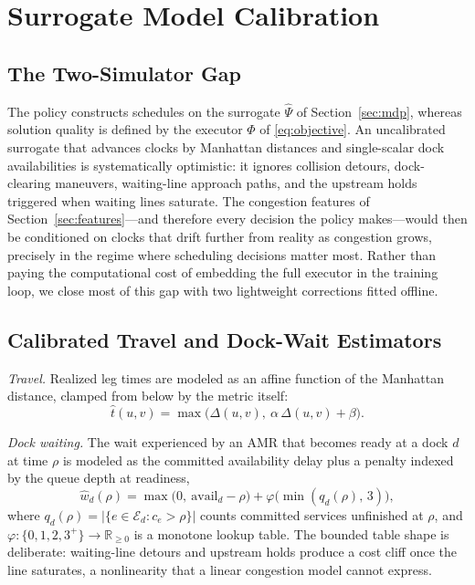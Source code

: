 
\section{Surrogate Model Calibration}
\label{sec:calibration}

\subsection{The Two-Simulator Gap}

The policy constructs schedules on the surrogate $\hat{\Psi}$ of
Section~\ref{sec:mdp}, whereas solution quality is defined by the
executor $\Phi$ of \eqref{eq:objective}. An uncalibrated surrogate that
advances clocks by Manhattan distances and single-scalar dock
availabilities is systematically optimistic: it ignores collision
detours, dock-clearing maneuvers, waiting-line approach paths, and the
upstream holds triggered when waiting lines saturate. The congestion
features of Section~\ref{sec:features}---and therefore every decision
the policy makes---would then be conditioned on clocks that drift
further from reality as congestion grows, precisely in the regime where
scheduling decisions matter most. Rather than paying the computational
cost of embedding the full executor in the training loop, we close most
of this gap with two lightweight corrections fitted offline.

\subsection{Calibrated Travel and Dock-Wait Estimators}

\emph{Travel.} Realized leg times are modeled as an affine function of
the Manhattan distance, clamped from below by the metric itself:
\begin{equation}
\hat{t}(u,v)=\max\!\big(\Delta(u,v),\ \alpha\,\Delta(u,v)+\beta\big).
\label{eq:travelcal}
\end{equation}

\emph{Dock waiting.} The wait experienced by an AMR that becomes ready
at a dock $d$ at time $\rho$ is modeled as the committed availability
delay plus a penalty indexed by the queue depth at readiness,
\begin{equation}
\hat{w}_d(\rho)=\max\!\big(0,\ \mathrm{avail}_d-\rho\big)
+\varphi\!\big(\min(q_d(\rho),\,3)\big),
\label{eq:waitcal}
\end{equation}
where $q_d(\rho)=|\{e\in\mathcal{E}_d : c_e>\rho\}|$ counts committed
services unfinished at $\rho$, and
$\varphi:\{0,1,2,3^{+}\}\to\mathbb{R}_{\ge0}$ is a monotone lookup
table. The bounded table shape is deliberate: waiting-line detours and
upstream holds produce a cost cliff once the line saturates, a
nonlinearity that a linear congestion model cannot express.

